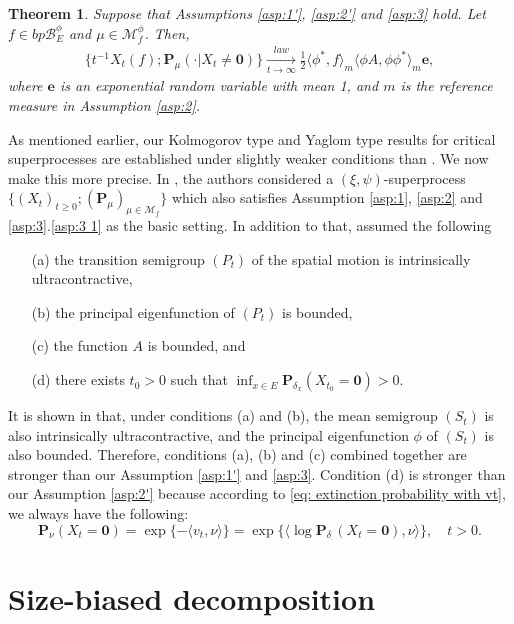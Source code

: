 \documentclass[UTF8]{pkuthss}
\theoremstyle{plain}
\newtheorem{thm}{Theorem}[section]
\theoremstyle{definition}
\numberwithin{equation}{section}
\begin{document}
\begin{thm}\label{thm:Yaglom-type-theorem}
	Suppose that Assumptions  \ref{asp:1'}, \ref{asp:2'} and \ref{asp:3} hold.
	Let $f\in bp\mathscr B^\phi_E$ and $\mu\in\mathcal M^\phi_f$.
	Then,
\[\begin{split}
	\big\{t^{-1}X_t(f);\mathbf P_\mu(\cdot | X_t\neq \mathbf 0)\big\}
	\xrightarrow[t\to\infty]{law} \frac{1}{2}\langle \phi^*, f\rangle_m\langle \phi A, \phi\phi^*\rangle_m \mathbf e,
\end{split}\]
	where $\mathbf e$ is an exponential random variable with mean 1,
 and $m$ is the reference measure  in Assumption \ref{asp:2}.
\end{thm}

	As mentioned earlier, our Kolmogorov type and Yaglom type results for critical superprocesses are established under slightly weaker conditions than \cite{RenSongZhang2015Limit}.
We now make this more precise.
	In \cite{RenSongZhang2015Limit}, the authors considered a $(\xi,\psi)$-superprocess $\{(X_t)_{t\geq 0}; (\mathbf P_\mu)_{\mu \in \mathcal M_f}\}$ which also satisfies Assumption \ref{asp:1}, \ref{asp:2} and \ref{asp:3}.\eqref{asp:3 1} as the basic setting. In addition to that, \cite{RenSongZhang2015Limit} assumed the following
\begin{itemize}
\item[(a)]
	the transition semigroup $(P_t)$ of the spatial motion is intrinsically ultracontractive,
\item[(b)]
	the principal eigenfunction of $(P_t)$ is bounded,
\item[(c)]
	the function $A$ is bounded, and
\item[(d)]
	there exists $t_0>0$ such that $\inf_{x\in E} \mathbf P_{\delta_x}(X_{t_0}= \mathbf 0)>0$.
\end{itemize}
It is shown in \cite{RenSongZhang2015Limit} that, under conditions (a) and (b), the mean semigroup $(S_t)$ is also intrinsically ultracontractive, and the principal eigenfunction $\phi$ of $(S_t)$ is also bounded. Therefore, conditions (a), (b) and (c) combined together are stronger than our Assumption \ref{asp:1'} and \ref{asp:3}. Condition (d) is stronger than our Assumption \ref{asp:2'} because according to \eqref{eq: extinction probability with vt}, we always have the following:
\[
	\mathbf P_\nu(X_t  = \mathbf 0) = \exp\{-\langle v_t,\nu \rangle\} = \exp\{\langle \log \mathbf P_{\delta_\cdot}(X_t = \mathbf 0),\nu \rangle\},\quad t>0.
\]



\section{Size-biased decomposition}
\end{document}
